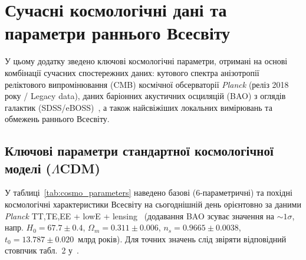
\chapter{Сучасні космологічні дані та параметри раннього Всесвіту}
\label{app:data}

У цьому додатку зведено ключові космологічні параметри, отримані на основі комбінації сучасних спостережних даних: кутового спектра анізотропії реліктового випромінювання (CMB) космічної обсерваторії \textit{Planck} (реліз 2018 року / Legacy data), даних баріонних акустичних осциляцій (BAO) з оглядів галактик (SDSS/eBOSS)~\cite{eisenstein_2005}, а також найсвіжіших локальних вимірювань та обмежень раннього Всесвіту.

\section{Ключові параметри стандартної космологічної\\ моделі ($\Lambda$CDM)}

У таблиці~\ref{tab:cosmo_parameters} наведено базові (6-параметричні) та похідні космологічні характеристики Всесвіту на сьогоднішній день орієнтовно за даними \textit{Planck} TT,TE,EE + lowE + lensing~\cite{planck_2018} (додавання BAO зсуває значення на $\sim1\sigma$, напр. $H_0=67.7\pm0.4$, $\Omega_m=0.311\pm0.006$, $n_s=0.9665\pm0.0038$, $t_0=13.787\pm0.020$~млрд років). Для точних значень слід звіряти відповідний стовпчик табл.~2 у~\cite{planck_2018}.

